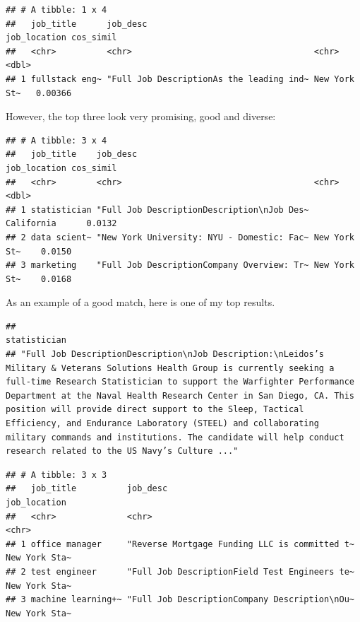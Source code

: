 \documentclass[
]{article}
\begin{document}
\begin{verbatim}
## # A tibble: 1 x 4
##   job_title      job_desc                                 job_location cos_simil
##   <chr>          <chr>                                    <chr>            <dbl>
## 1 fullstack eng~ "Full Job DescriptionAs the leading ind~ New York St~   0.00366
\end{verbatim}

However, the top three look very promising, good and diverse:

\begin{verbatim}
## # A tibble: 3 x 4
##   job_title    job_desc                                   job_location cos_simil
##   <chr>        <chr>                                      <chr>            <dbl>
## 1 statistician "Full Job DescriptionDescription\nJob Des~ California      0.0132
## 2 data scient~ "New York University: NYU - Domestic: Fac~ New York St~    0.0150
## 3 marketing    "Full Job DescriptionCompany Overview: Tr~ New York St~    0.0168
\end{verbatim}

As an example of a good match, here is one of my top results.

\begin{verbatim}
##                                                                                                                                                                                                                                                                                                                                                                                                                                                                                                             statistician 
## "Full Job DescriptionDescription\nJob Description:\nLeidos’s Military & Veterans Solutions Health Group is currently seeking a full-time Research Statistician to support the Warfighter Performance Department at the Naval Health Research Center in San Diego, CA. This position will provide direct support to the Sleep, Tactical Efficiency, and Endurance Laboratory (STEEL) and collaborating military commands and institutions. The candidate will help conduct research related to the US Navy’s Culture ..."
\end{verbatim}

\begin{verbatim}
## # A tibble: 3 x 3
##   job_title          job_desc                                      job_location 
##   <chr>              <chr>                                         <chr>        
## 1 office manager     "Reverse Mortgage Funding LLC is committed t~ New York Sta~
## 2 test engineer      "Full Job DescriptionField Test Engineers te~ New York Sta~
## 3 machine learning+~ "Full Job DescriptionCompany Description\nOu~ New York Sta~
\end{verbatim}
\end{document}
